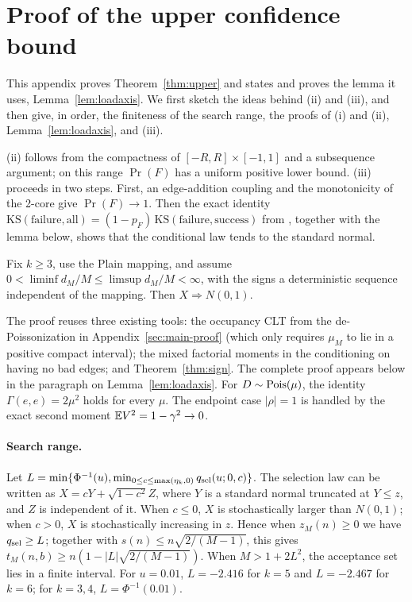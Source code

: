 \section{Proof of the upper confidence bound}\label{app:upper}
This appendix proves Theorem~\ref{thm:upper} and states and proves the lemma it uses,
Lemma~\ref{lem:loadaxis}. We first sketch the ideas behind (ii) and (iii), and then give, in
order, the finiteness of the search range, the proofs of (i) and (ii), Lemma~\ref{lem:loadaxis},
and (iii).

(ii) follows from the compactness of $[-R,R]\times[-1,1]$ and a subsequence argument; on this range
$\Pr(F)$ has a uniform positive lower bound. (iii) proceeds in two steps. First, an edge-addition
coupling and the monotonicity of the 2-core give $\Pr(F)\to1$. Then the exact identity
$\mathrm{KS}(\text{failure},\text{all})=(1-p_F)\,\mathrm{KS}(\text{failure},\text{success})$
from \cite{prior}, together with the lemma below, shows that the conditional law tends to the
standard normal.

\begin{lemma}\label{lem:loadaxis}
Fix $k\ge3$, use the Plain mapping, and assume $0<\liminf d_M/M\le\limsup d_M/M<\infty$, with the
signs a deterministic sequence independent of the mapping. Then $X\Rightarrow N(0,1)$.
\end{lemma}
The proof reuses three existing tools: the occupancy CLT from the de-Poissonization in
Appendix~\ref{sec:main-proof} (which only requires $\mu_M$ to lie in a positive compact interval);
the mixed factorial moments in the conditioning on having no bad edges; and Theorem~\ref{thm:sign}.
The complete proof appears below in the paragraph on Lemma~\ref{lem:loadaxis}. For
$D\sim\operatorname{Pois}(\mu)$, the identity $\Gamma(e,e)=2\mu^2$ holds for every $\mu$. The endpoint case
$|\rho|=1$ is handled by the exact second moment $\mathbb E V^2=1-\gamma^2\to0$.

\paragraph{Search range.} Let
$L=\min\{\Phi^{-1}(u),\min_{0\le c\le\max(\eta_k,0)}q_{\rm sel}(u;0,c)\}$. The selection law can be
written as $X=cY+\sqrt{1-c^2}Z$, where $Y$ is a standard normal truncated at $Y\le z$, and $Z$ is
independent of it. When $c\le0$, $X$ is stochastically larger than $N(0,1)$; when $c>0$, $X$ is
stochastically increasing in $z$. Hence when $z_M(n)\ge0$ we have $q_{\rm sel}\ge L$; together with
$s(n)\le n\sqrt{2/(M-1)}$, this gives $t_M(n,b)\ge n(1-|L|\sqrt{2/(M-1)})$. When $M>1+2L^2$, the
acceptance set lies in a finite interval. For $u=0.01$, $L=-2.416$ for $k=5$ and $L=-2.467$ for
$k=6$; for $k=3,4$, $L=\Phi^{-1}(0.01)$.

